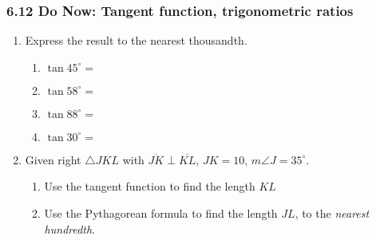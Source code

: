\documentclass[12pt, oneside]{article}
\begin{document}
\subsubsection*{6.12 Do Now: Tangent function, trigonometric ratios}
 \begin{enumerate}

    \item Express the result to the nearest thousandth.  \vspace{.5cm}
      \begin{multicols}{2}
        \begin{enumerate}
          \item $\tan 45^\circ = $ \vspace{1cm}
          \item $\tan 58^\circ =$
          \item $\tan 88^\circ = $ \vspace{1cm}
          \item $\tan 30^\circ =$
        \end{enumerate}
      \end{multicols} \vspace{1cm}

      \item Given right $\triangle JKL$ with $\overline{JK} \perp \overline{KL}$, $JK=10$, $m\angle J=35^\circ$.
      \begin{flushright}
         \vspace{1cm}
      \end{flushright}
      \begin{enumerate}
        \item Use the tangent function to find the length $KL$\\[3cm]
        \item Use the Pythagorean formula to find the length $JL$, to the \emph{nearest hundredth}.\\[3cm]


\end{enumerate}
\end{enumerate}
\end{document}
